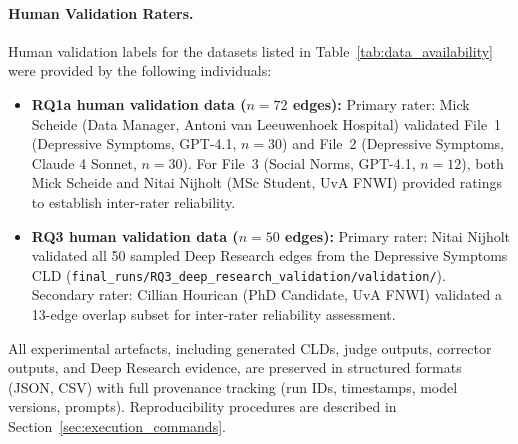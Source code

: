 \paragraph{Human Validation Raters.} Human validation labels for the datasets listed in Table~\ref{tab:data_availability} were provided by the following individuals:
\begin{itemize}[noitemsep]
    \item \textbf{RQ1a human validation data ($n=72$ edges):} Primary rater: Mick Scheide (Data Manager, Antoni van Leeuwenhoek Hospital) validated File~1 (Depressive Symptoms, GPT-4.1, $n=30$) and File~2 (Depressive Symptoms, Claude 4 Sonnet, $n=30$). For File~3 (Social Norms, GPT-4.1, $n=12$), both Mick Scheide and Nitai Nijholt (MSc Student, UvA FNWI) provided ratings to establish inter-rater reliability.
    \item \textbf{RQ3 human validation data ($n=50$ edges):} Primary rater: Nitai Nijholt validated all 50 sampled Deep Research edges from the Depressive Symptoms CLD (\texttt{final\_runs/RQ3\_deep\_research\_validation/validation/}). Secondary rater: Cillian Hourican (PhD Candidate, UvA FNWI) validated a 13-edge overlap subset for inter-rater reliability assessment.
\end{itemize}

All experimental artefacts, including generated CLDs, judge outputs, corrector outputs, and Deep Research evidence, are preserved in structured formats (JSON, CSV) with full provenance tracking (run IDs, timestamps, model versions, prompts). Reproducibility procedures are described in Section~\ref{sec:execution_commands}.
